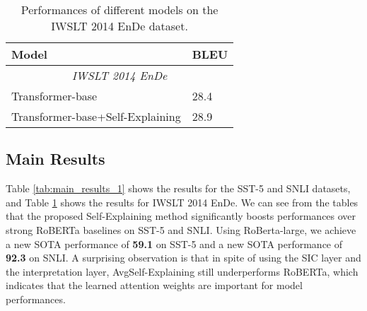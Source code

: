 \documentclass[11pt,a4paper]{article}
\begin{document}
\begin{table}[t]
  \centering
  \small
  \begin{tabular}{ll}
    \toprule
    {\bf Model} & {\bf BLEU}\\
    \hline\hline 
    \multicolumn{2}{c}{\textit{IWSLT 2014 EnDe}}\\
    \midrule
    Transformer-base \citep{vaswani2017attention} & 28.4\\
    Transformer-base+Self-Explaining & 28.9\\
    \bottomrule
  \end{tabular}
  \caption{Performances of different models on the IWSLT 2014 EnDe dataset.}
  \label{tab:main_results_2}
\end{table}

\subsection{Main Results}
Table \ref{tab:main_results_1} shows the results for the SST-5 and SNLI datasets, and Table \ref{tab:main_results_2} shows the results for IWSLT 2014 EnDe. We can see from the tables that the proposed Self-Explaining method  significantly boosts performances over strong RoBERTa baselines on SST-5 and SNLI. 
Using RoBerta-large,  we
 achieve a new SOTA performance of {\bf 59.1} on SST-5 and 
  a new SOTA performance of {\bf 92.3} 
 on SNLI. 
A surprising observation is that in spite of using the SIC layer and the interpretation layer, AvgSelf-Explaining still underperforms RoBERTa, which indicates that  the learned attention weights  are important for model performances.
\end{document}
